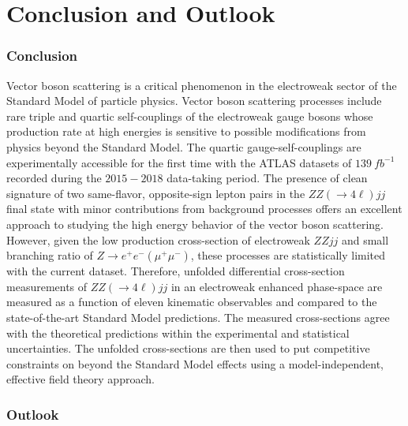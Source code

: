 \part {\LARGE{Conclusion and Outlook}}

\section{Conclusion}
\label{sec:Conclusion}

Vector boson scattering is a critical phenomenon in the electroweak sector of the Standard Model of particle physics. Vector boson scattering processes include rare triple and quartic self-couplings of the electroweak gauge bosons whose production rate at high energies is sensitive to possible modifications from physics beyond the Standard Model. The quartic gauge-self-couplings are experimentally accessible for the first time with the ATLAS datasets of $139 ~fb^{-1}$ recorded during the $2015-2018$ data-taking period. The presence of clean signature of two same-flavor, opposite-sign lepton pairs in the $ZZ (\rightarrow 4\ell) jj$ final state with minor contributions from background processes offers an excellent approach to studying the high energy behavior of the vector boson scattering. However, given the low production cross-section of electroweak $ZZjj$ and small branching ratio of $Z\rightarrow e^+e^- (\mu^+\mu^-)$, these processes are statistically limited with the current dataset. Therefore, unfolded differential cross-section measurements of $ZZ (\rightarrow 4\ell) jj$ in an electroweak enhanced phase-space are measured as a function of eleven kinematic observables and compared to the state-of-the-art Standard Model predictions. The measured cross-sections agree with the theoretical predictions within the experimental and statistical uncertainties. The unfolded cross-sections are then used to put competitive constraints on beyond the Standard Model effects using a model-independent, effective field theory approach. 

\section{Outlook}
\label{sec:Outlook}

